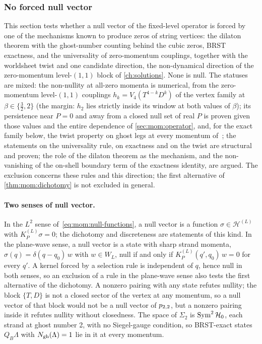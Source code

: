 \subsubsection{No forced null vector}
\label{sec:mom:forced}


This section tests whether a null vector of the fixed-level operator is forced by one of the mechanisms known to produce zeros of string vertices: the dilaton theorem with the ghost-number counting behind the cubic zeros, BRST exactness, and the universality of zero-momentum couplings, together with the worldsheet twist and one candidate direction, the non-dynamical direction of the zero-momentum level-$(1, 1)$ block of \cref{ch:solutions}.
None is null.
The statuses are mixed: the non-nullity at all-zero momenta is numerical, from the zero-momentum level-$(1, 1)$ couplings $h_k = V_4(T^{4 - k} D^k)$ of the vertex family at $\beta \in \{\tfrac{3}{2}, 2\}$ (the margin: $h_2$ lies strictly inside its window at both values of $\beta$); its persistence near $P = 0$ and away from a closed null set of real $P$ is proven given those values and the entire dependence of \cref{sec:mom:operator}, and, for the exact family below, the twist property on ghost legs at every momentum of~\cite{Erbin:2026:SL2CVerticesClosed}; the statements on the universality rule, on exactness and on the twist are structural and proven; the role of the dilaton theorem as the mechanism, and the non-vanishing of the on-shell boundary term of the exactness identity, are argued.
The exclusion concerns these rules and this direction; the first alternative of \cref{thm:mom:dichotomy} is not excluded in general.

\paragraph{Two senses of null vector.}
In the $L^2$ sense of~\eqref{eq:mom:null-functions}, a null vector is a function $\sigma \in \mathcal H^{(L)}$ with $K^{(L)}_P \sigma = 0$; the dichotomy and discreteness are statements of this kind.
In the plane-wave sense, a null vector is a state with sharp strand momenta, $\sigma(q) = \delta(q - q_0) \, w$ with $w \in W_L$, null if and only if $K^{(L)}_P(q', q_0) \, w = 0$ for every $q'$.
A kernel forced by a selection rule is independent of $q$, hence null in both senses, so an exclusion of a rule in the plane-wave sense also tests the first alternative of the dichotomy.
A nonzero pairing with any state refutes nullity; the block $\{T, D\}$ is not a closed sector of the vertex at any momentum, so a null vector of that block would not be a null vector of $p_{2,2}$, but a nonzero pairing inside it refutes nullity without closedness.
The space of $\Sigma_2$ is $\operatorname{Sym}^2 \mathcal H_0$, each strand at ghost number 2, with no Siegel-gauge condition, so BRST-exact states $Q_B \Lambda$ with $N_{\rm gh}(\Lambda) = 1$ lie in it at every momentum.

